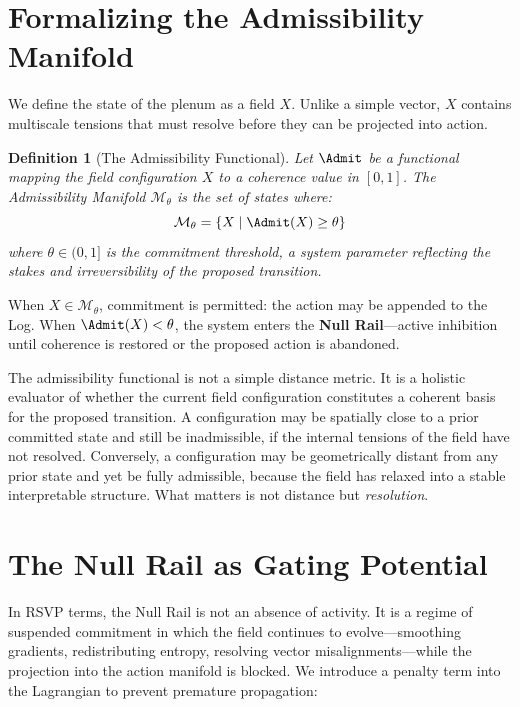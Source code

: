 \documentclass[11pt,oneside]{book}
\newtheorem{definition}{Definition}[chapter]
\begin{document}
\section{Formalizing the Admissibility Manifold}

We define the state of the plenum as a field $X$. Unlike a simple vector, $X$ contains multiscale tensions that must resolve before they can be projected into action.

\begin{definition}[The Admissibility Functional]
Let $\Admit$ be a functional mapping the field configuration $X$ to a coherence value in $[0,1]$. The \emph{Admissibility Manifold} $\mathcal{M}_\theta$ is the set of states where:
\begin{equation}
    \mathcal{M}_\theta = \{ X \mid \Admit(X) \ge \theta \}
\end{equation}
where $\theta \in (0,1]$ is the commitment threshold, a system parameter reflecting the stakes and irreversibility of the proposed transition.
\end{definition}

When $X \in \mathcal{M}_\theta$, commitment is permitted: the action may be appended to the Log. When $\Admit(X) < \theta$, the system enters the \textbf{Null Rail}---active inhibition until coherence is restored or the proposed action is abandoned.

The admissibility functional is not a simple distance metric. It is a holistic evaluator of whether the current field configuration constitutes a coherent basis for the proposed transition. A configuration may be spatially close to a prior committed state and still be inadmissible, if the internal tensions of the field have not resolved. Conversely, a configuration may be geometrically distant from any prior state and yet be fully admissible, because the field has relaxed into a stable interpretable structure. What matters is not distance but \textit{resolution}.

\section{The Null Rail as Gating Potential}

In RSVP terms, the Null Rail is not an absence of activity. It is a regime of suspended commitment in which the field continues to evolve---smoothing gradients, redistributing entropy, resolving vector misalignments---while the projection into the action manifold is blocked. We introduce a penalty term into the Lagrangian to prevent premature propagation:
\end{document}
